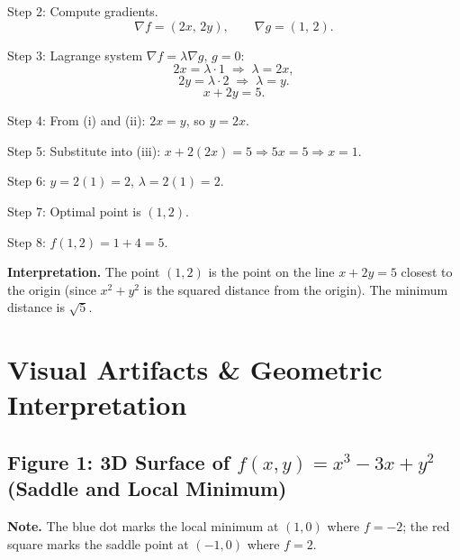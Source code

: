 \documentclass[12pt,a4paper]{article}
\begin{document}
Step 2: Compute gradients.
\[
  \nabla f = (2x,\, 2y), \qquad \nabla g = (1,\, 2).
\]

Step 3: Lagrange system $\nabla f = \lambda \nabla g$, $g = 0$:
\[
  2x = \lambda \cdot 1 \;\Rightarrow\; \lambda = 2x, \tag{i}
\]
\[
  2y = \lambda \cdot 2 \;\Rightarrow\; \lambda = y. \tag{ii}
\]
\[
  x + 2y = 5. \tag{iii}
\]

Step 4: From (i) and (ii): $2x = y$, so $y = 2x$.

Step 5: Substitute into (iii): $x + 2(2x) = 5 \Rightarrow 5x = 5 \Rightarrow x = 1$.

Step 6: $y = 2(1) = 2$, $\lambda = 2(1) = 2$.

Step 7: Optimal point is $(1,2)$.

Step 8: $f(1,2) = 1 + 4 = 5$.

\textbf{Interpretation.} The point $(1,2)$ is the point on the line $x + 2y = 5$ closest to the origin (since $x^{2}+y^{2}$ is the squared distance from the origin). The minimum distance is $\sqrt{5}$.

\section{Visual Artifacts \& Geometric Interpretation}

\subsection*{Figure 1: 3D Surface of $f(x,y) = x^{3} - 3x + y^{2}$ (Saddle and Local Minimum)}

\begin{center}
\end{center}

\noindent\textbf{Note.} The blue dot marks the local minimum at $(1,0)$ where $f = -2$; the red square marks the saddle point at $(-1,0)$ where $f = 2$.
\end{document}
